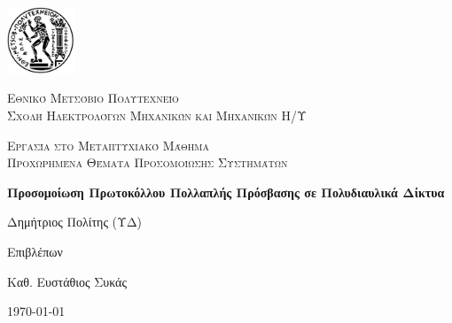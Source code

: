 \documentclass[12pt]{report}
\newcommand\blankpage{%
    \null
    \thispagestyle{empty}%
    \addtocounter{page}{-1}%
    \newpage}
\begin{document}

\hypersetup{pageanchor=false}

\begin{titlepage}
  \centering
  \includegraphics[width=0.15\textwidth]{pyrforos}\par\vspace{1cm}
  {\scshape\LARGE Εθνικό Μετσόβιο Πολυτεχνείο\\
  Σχολή Ηλεκτρολόγων Μηχανικών και Μηχανικών Η/Υ\par}
  \vspace{1cm}
  {\scshape\Large Εργασία στο Μεταπτυχιακό Μάθημα\\
  Προχωρημένα Θέματα Προσομοίωσης Συστημάτων\par}
  \vspace{1.5cm}
  {\Large\bfseries Προσομοίωση Πρωτοκόλλου Πολλαπλής Πρόσβασης σε Πολυδιαυλικά Δίκτυα\par}
  \vspace{2cm}
  {\large Δημήτριος Πολίτης (ΥΔ)\par}
  \vfill
  Επιβλέπων \par
  Καθ. Ευστάθιος Συκάς

  \vfill

  {\large \today\par}
  \afterpage{\blankpage}
\end{titlepage}

\tableofcontents
\thispagestyle{empty}

\listoftables
\thispagestyle{empty}

\listoffigures
\thispagestyle{empty}
\end{document}
